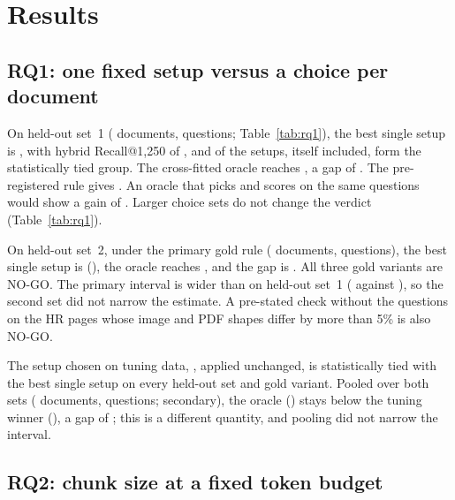\section{Results}\label{sec:results}

\subsection{RQ1: one fixed setup versus a choice per document}\label{sec:rq1}



On held-out set~1 (\RQoneDocuments{} documents, \RQoneQuestions{} questions;
Table~\ref{tab:rq1}), the best single setup is \RQoneBest{}, with hybrid
Recall@1,250 of \RQoneBestRecall{}, and \RQoneTied{} of the \RQoneSetups{} setups,
itself included, form the statistically tied group. The cross-fitted oracle
reaches \RQoneOracle{}, a gap of \RQonePrimaryGap{} \RQonePrimaryGapCI{}. The
pre-registered rule gives \RQoneDecision{}. An oracle that picks and scores on
the same questions would show a gain of \RQoneRawGap{}. Larger choice sets do not
change the verdict (Table~\ref{tab:rq1}).

On held-out set~2, under the primary gold rule (\RQoneHTwoDropRuleDocuments{}
documents, \RQoneHTwoDropRuleQuestions{} questions), the best single setup is
\RQoneHTwoDropRuleBest{} (\RQoneHTwoDropRuleBestRecall{}), the oracle reaches
\RQoneHTwoDropRuleOracle{}, and the gap is \RQoneHTwoDropRuleGap{}
\RQoneHTwoDropRuleGapCI{}. All three gold variants are NO-GO. The primary interval
is wider than on held-out set~1 (\RQoneHTwoDropRuleGapWidth{} against
\RQonePrimaryGapWidth{}), so the second set did not narrow the estimate. A
pre-stated check without the questions on the \RQoneHRCheckPages{} HR pages whose
image and PDF shapes differ by more than 5\% is also NO-GO.

The setup chosen on tuning data, \RQoneTuningWinner{}, applied unchanged, is
statistically tied with the best single setup on every held-out set and gold
variant. Pooled over both sets (\RQonePooledDocuments{} documents,
\RQonePooledQuestions{} questions; secondary), the oracle
(\RQonePooledOracle{}) stays below the tuning winner
(\RQonePooledTuningWinnerRecall{}), a gap of \RQonePooledGap{}
\RQonePooledGapCI{}; this is a different quantity, and pooling did not narrow the
interval. 

\subsection{RQ2: chunk size at a fixed token budget}\label{sec:rq2}

